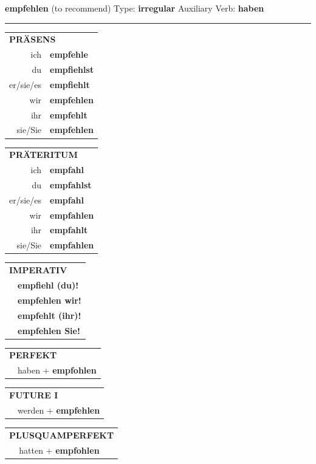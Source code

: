 \documentclass[10pt,a4paper]{revtex4-2}
\begin{document}
\begin{verbbox}
{\Large \bf empfehlen} (to recommend) \hfill Type: \textbf{irregular} \hfill Auxiliary Verb: \textbf{haben}

\vspace{5pt}
\hrule
\vspace{5pt}

\begin{tabular}{rl}
\multicolumn{2}{l}{\textbf{PRÄSENS}}\\
ich & \textbf{empfehle}\\
du & \textbf{empfiehlst}\\
er/sie/es & \textbf{empfiehlt}\\
wir & \textbf{empfehlen}\\
ihr & \textbf{empfehlt}\\
sie/Sie & \textbf{empfehlen}\\
\end{tabular}
\hfill
\begin{tabular}{rl}
\multicolumn{2}{l}{\textbf{PRÄTERITUM}}\\
ich & \textbf{empfahl}\\
du & \textbf{empfahlst}\\
er/sie/es & \textbf{empfahl}\\
wir & \textbf{empfahlen}\\
ihr & \textbf{empfahlt}\\
sie/Sie & \textbf{empfahlen}\\
\end{tabular}
\hfill
\begin{tabular}{rl}
\multicolumn{2}{l}{\textbf{IMPERATIV}}\\
& \textbf{empfiehl (du)!}\\
& \textbf{empfehlen wir!}\\
& \textbf{empfehlt (ihr)!}\\
& \textbf{empfehlen Sie!}\\
\end{tabular}

\vspace{10pt}

\begin{tabular}{rl}
\multicolumn{2}{l}{\textbf{PERFEKT}}\\
& haben + \textbf{empfohlen}\\
\end{tabular}
\hfill
\begin{tabular}{rl}
\multicolumn{2}{l}{\textbf{FUTURE I}}\\
& werden + \textbf{empfehlen}\\
\end{tabular}
\hfill
\begin{tabular}{rl}
\multicolumn{2}{l}{\textbf{PLUSQUAMPERFEKT}}\\
& hatten + \textbf{empfohlen}\\
\end{tabular}


\end{verbbox}
\end{document}
